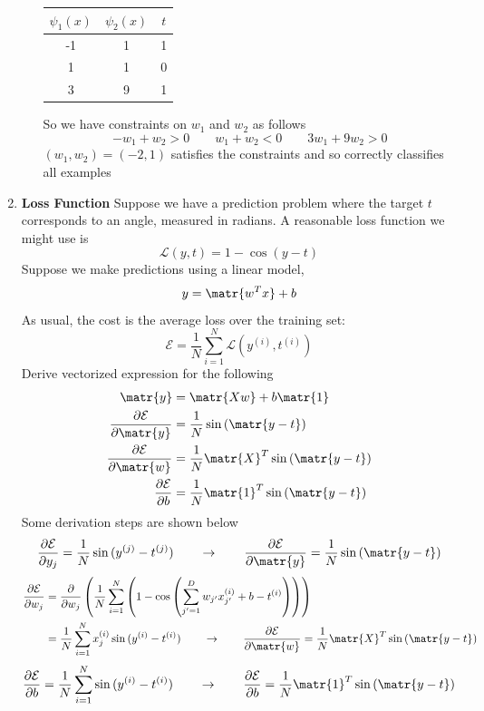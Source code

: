 \documentclass[11pt]{article}
\begin{document}
\begin{enumerate}
\begin{enumerate}
\begin{center}
\begin{tabular}{c c | c}
            $\psi_1(x)$ & $\psi_2(x)$ & $t$ \\ 
            \hline
            -1 & 1 & 1 \\
            1 & 1 & 0 \\
            3 & 9 & 1 \\ 
        \end{tabular}
    \end{center}
    So we have constraints on $w_1$ and $w_2$ as follows 
    \[
        -w_1 + w_2 > 0 
        \quad \quad 
        w_1 + w_2 < 0
        \quad \quad 
        3w_1 + 9w_2 > 0
    \]
    $(w_1,w_2) = (-2,1)$ satisfies the constraints and so correctly classifies all examples
\end{enumerate}


\item \textbf{Loss Function} Suppose we have a prediction problem where the target $t$ corresponds to an angle, measured in radians. A reasonable loss function we might use is
\[
    \mathcal{L}(y,t) = 1 - \cos(y-t)    
\]
Suppose we make predictions using a linear model, 
\[
    y = \matr{w^Tx} + b     
\]
As usual, the cost is the average loss over the training set:
\[
    \mathcal{E} = \frac{1}{N} \sum_{i=1}^N \mathcal{L}(y^{(i)}, t^{(i)})    
\]
Derive vectorized expression for the following 
\begin{align*}
    \matr{y} &= \matr{Xw} + b\matr{1} \\
    \frac{\partial \mathcal{E}}{\partial \matr{y}} &= \frac{1}{N} \sin{(\matr{y - t})} \\
    \frac{\partial \mathcal{E}}{\partial \matr{w}} &= \frac{1}{N} \matr{X}^T \sin{(\matr{y-t})} \\ 
    \frac{\partial \mathcal{E}}{\partial b} &= \frac{1}{N} \matr{1}^T \sin{(\matr{y-t})} \\ 
\end{align*}
Some derivation steps are shown below 
\[
    \frac{\partial \mathcal{E}}{\partial y_j} = \frac{1}{N} \sin{(y^{(j)} - t^{(j)})}
    \quad \quad \rightarrow \quad \quad 
    \frac{\partial \mathcal{E}}{\partial \matr{y}} = \frac{1}{N} \sin{(\matr{y - t})} 
\]
\begin{align*}
    \frac{\partial \mathcal{E}}{\partial w_j} 
    &= \frac{\partial}{\partial w_j} \left(
        \frac{1}{N} \sum_{i=1}^N \left( 1 -\cos{\left(\sum_{j'=1}^D w_{j'}x_{j'}^{(i)} +b - t^{(i)} \right)} \right)    
    \right) \\ 
    &= \frac{1}{N} \sum_{i=1}^N x_j^{(i)} \sin{(y^{(i)} - t^{(i)})} 
    \quad \quad \rightarrow \quad \quad 
    \frac{\partial \mathcal{E}}{\partial \matr{w}} = \frac{1}{N} \matr{X}^T \sin{(\matr{y-t})}
\end{align*}
\[
    \frac{\partial \mathcal{E}}{\partial b} 
    = \frac{1}{N} \sum_{i=1}^N \sin{(y^{(i)} - t^{(i)})} 
    \quad \quad \rightarrow \quad \quad 
    \frac{\partial \mathcal{E}}{\partial b} = \frac{1}{N} \matr{1}^T \sin{(\matr{y-t})} 
\]






\end{enumerate}
\end{document}
